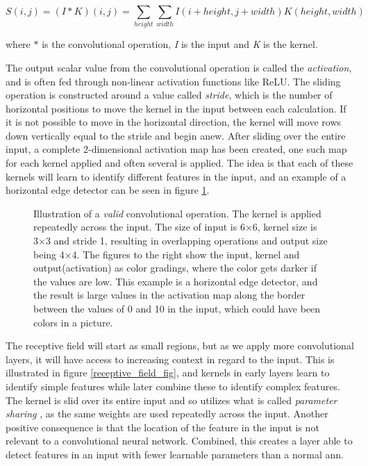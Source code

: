         \begin{equation}
            S(i,j) = (I*K)(i,j) = \sum_{height}\sum_{width}I(i+height,j+width)K(height,width)
        \end{equation}
     
     where $*$ is the convolutional operation, \textit{I} is the input and \textit{K} is the kernel.
     
     The output scalar value from the convolutional operation is called the \textit{activation}, and is often fed through non-linear activation functions like ReLU\cite{o2015introduction_convolutions}. The sliding operation is constructed around a value called \textit{stride}, which is the number of horizontal positions to move the kernel in the input between each calculation. If it is not possible to move in the horizontal direction, the kernel will move rows down vertically equal to the stride and begin anew. After sliding over the entire input, a complete 2-dimensional activation map has been created, one such map for each kernel applied and often several is applied. The idea is that each of these kernels will learn to identify different features in the input, and an example of a horizontal edge detector can be seen in figure \ref{convolutional_fig}. 
    \begin{figure}[H]
        \centering
                
        \caption[Horizontal edge detector example]{Illustration of a \textit{valid} convolutional operation. The kernel is applied repeatedly across the input. The size of input is 6×6, kernel size is 3×3 and stride 1, resulting in overlapping operations and output size being 4×4. The figures to the right show the input, kernel and output(activation) as color gradings, where the color gets darker if the values are low. This example is a horizontal edge detector, and the result is large values in the activation map along the border between the values of 0 and 10 in the input, which could have been colors in a picture.}
      	\medskip 
        \label{convolutional_fig}
    \end{figure}
    
    The receptive field will start as small regions, but as we apply more convolutional layers, it will have access to increasing context in regard to the input\cite{o2015introduction_convolutions}. This is illustrated in figure \ref{receptive_field_fig}, and kernels in early layers learn to identify simple features while later combine these to identify complex features. The kernel is slid over its entire input and so utilizes what is called \textit{parameter sharing }, as the same weights are used repeatedly across the input. Another positive consequence is that the location of the feature in the input is not relevant to a convolutional neural network. Combined, this creates a layer able to detect features in an input with fewer learnable parameters than a normal \gls{ann}. 
    
